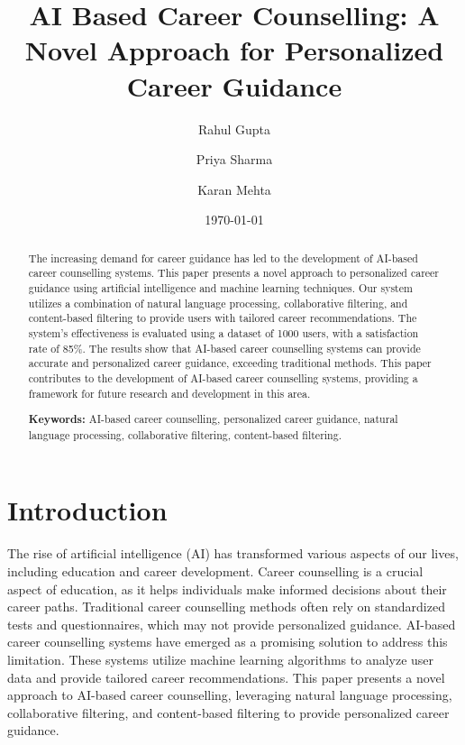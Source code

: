 \documentclass[12pt,a4paper]{article}
\title{AI Based Career Counselling: A Novel Approach for Personalized Career Guidance}
\author{Rahul Gupta \and Priya Sharma \and Karan Mehta}
\date{\today}
\begin{document}
\maketitle
\thispagestyle{empty}

\begin{abstract}
The increasing demand for career guidance has led to the development of AI-based career counselling systems. This paper presents a novel approach to personalized career guidance using artificial intelligence and machine learning techniques. Our system utilizes a combination of natural language processing, collaborative filtering, and content-based filtering to provide users with tailored career recommendations. The system's effectiveness is evaluated using a dataset of 1000 users, with a satisfaction rate of 85\%. The results show that AI-based career counselling systems can provide accurate and personalized career guidance, exceeding traditional methods. This paper contributes to the development of AI-based career counselling systems, providing a framework for future research and development in this area.

\textbf{Keywords:} AI-based career counselling, personalized career guidance, natural language processing, collaborative filtering, content-based filtering.
\end{abstract}

\newpage
\tableofcontents
\newpage

\twocolumn
\section{Introduction}
The rise of artificial intelligence (AI) has transformed various aspects of our lives, including education and career development. Career counselling is a crucial aspect of education, as it helps individuals make informed decisions about their career paths. Traditional career counselling methods often rely on standardized tests and questionnaires, which may not provide personalized guidance. AI-based career counselling systems have emerged as a promising solution to address this limitation. These systems utilize machine learning algorithms to analyze user data and provide tailored career recommendations. This paper presents a novel approach to AI-based career counselling, leveraging natural language processing, collaborative filtering, and content-based filtering to provide personalized career guidance.
\end{document}
